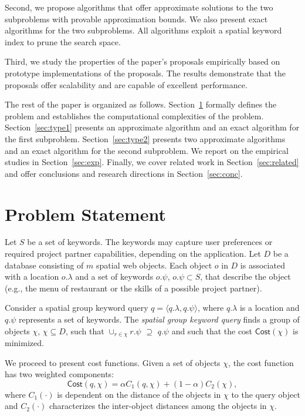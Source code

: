 \documentclass{sig-alternate}
\begin{document}
Second, we propose algorithms  that offer approximate solutions to
the two subproblems with provable approximation bounds. We also
present exact algorithms for the two subproblems. All algorithms
exploit a spatial keyword index to prune the search space.

Third, we study the properties of the paper's proposals empirically
based on prototype implementations of the proposals. The results
demonstrate that the proposals offer scalability and are
capable of excellent performance.

The rest of the paper is organized as follows.
Section~\ref{sec:problem} formally defines the problem and
establishes the computational complexities of the problem.
Section~\ref{sec:type1} presents an approximate algorithm and an
exact algorithm for the first subproblem. Section~\ref{sec:type2}
presents two approximate algorithms and an exact algorithm for the
second subproblem. We report on the empirical studies in
Section~\ref{sec:exp}. Finally, we cover related work in
Section~\ref{sec:related} and offer conclusions and research
directions in Section~\ref{sec:conc}.


\section{Problem Statement} \label{sec:problem}

Let $S$ be a set of keywords. The keywords may capture user
preferences or required project partner capabilities, depending on
the application. Let $D$ be a database consisting of $m$ spatial web
objects. Each object $o$ in $D$ is associated with a location
$o.\lambda$ and a set of keywords $o.\psi$, $o.\psi \subset S$,
that describe the object (e.g., the menu of restaurant or the skills
of a possible project partner).

Consider a spatial group keyword query $q= \langle q.\lambda, q.\psi
\rangle$, where $q.\lambda$ is a location and $q.\psi$ represents a
set of keywords. The \emph{spatial group keyword query} finds a
group of objects $\chi$, $\chi \subseteq D$, such that $\cup_{r \in
\chi} r.\psi$ $\supseteq$ $q.\psi $ and such that the cost
$\mathsf{Cost}(\chi)$ is minimized.

We proceed to present cost functions. Given a set of objects $\chi$,
the cost function has two weighted components: \vspace{-1ex}
%
$$\mathsf{Cost}(q, \chi) = \alpha  C_1(q, \chi) + (1 - \alpha)
C_2(\chi),$$
%
where $C_1(\cdot)$ is dependent on the distance of the objects in
$\chi$ to the query object and $C_2(\cdot)$ characterizes the
inter-object distances among the objects in $\chi$.
\end{document}
